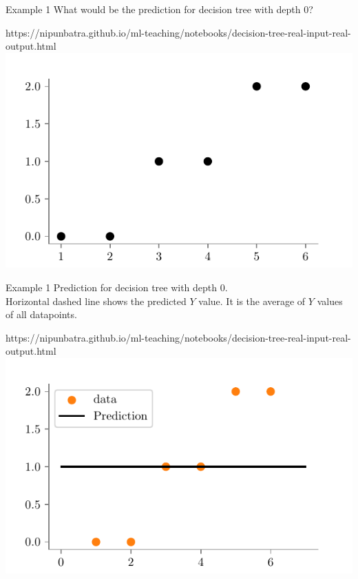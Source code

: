 \documentclass[usenames,dvipsnames]{beamer}
\begin{document}
    \begin{frame}{Example 1}
    What would be the prediction for decision tree with depth 0?
    \begin{center}
    	\begin{notebookbox}{https://nipunbatra.github.io/ml-teaching/notebooks/decision-tree-real-input-real-output.html}
    		\includegraphics{../assets/decision-trees/figures/ri-ro-dataset.pdf}
    	  \end{notebookbox}
    \end{center}
    \end{frame}

    \begin{frame}{Example 1}
    Prediction for decision tree with depth 0.\\
    Horizontal dashed line shows the predicted $Y$ value. It is the average of $Y$ values of all datapoints.\\
    \begin{center}
    	\begin{notebookbox}{https://nipunbatra.github.io/ml-teaching/notebooks/decision-tree-real-input-real-output.html}
    		\includegraphics{../assets/decision-trees/figures/ri-ro-depth-0.pdf}	
    	  \end{notebookbox}
    \end{center}
    \end{frame}
\end{document}
